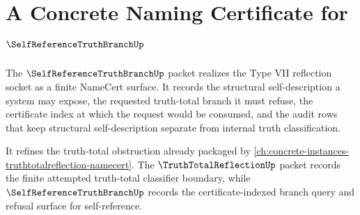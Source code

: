 \chapter{A Concrete Naming Certificate for $\SelfReferenceTruthBranchUp$}
\label{ch:concrete-instances-selfreferencetruthbranch-namecert}

The $\SelfReferenceTruthBranchUp$ packet realizes the Type VII reflection socket as a finite NameCert surface. It records the structural self-description a system may expose, the requested truth-total branch it must refuse, the certificate index at which the request would be consumed, and the audit rows that keep structural self-description separate from internal truth classification.

It refines the truth-total obstruction already packaged by \autoref{ch:concrete-instances-truthtotalreflection-namecert}. The $\TruthTotalReflectionUp$ packet records the finite attempted truth-total classifier boundary, while $\SelfReferenceTruthBranchUp$ records the certificate-indexed branch query and refusal surface for self-reference.

